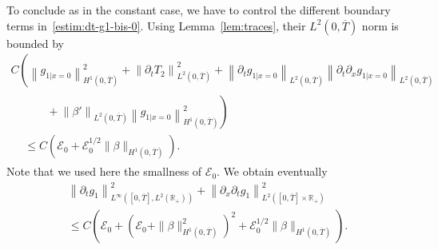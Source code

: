 \documentclass[AHL,Unicode,longabstracts,published]{cedram}
\newcommand{\R}{\mathbb{R}}
\newcommand{\p}{\partial}
\newcommand{\cE}{\mathcal E}
\begin{document}
To conclude as in the constant case, we have to control the different boundary terms in~\eqref{estim:dt-g1-bis-0}. Using Lemma~\ref{lem:traces}, their $L^2(0,\overline{T})$ norm is bounded by
\begin{multline*}
C\left(\left\| g_{1|x=0}\right\|_{H^1\left(0,\overline{T}\right)}^2 + \left\|\p_t T_2\right\|_{L^2\left(0,\overline{T}\right)}^2 + \left\|\p_t g_{1|x=0}\right\|_{L^2\left(0,\overline{T}\right)} \left\|\p_t \p_x g_{1|x=0}\right\|_{L^2\left(0,\overline{T}\right)}\right. \\
\begin{aligned}
&\qquad+\left. \left\|\beta'\right\|_{L^2\left(0,\overline{T}\right)} \left\|g_{1|x=0}\right\|_{H^1\left(0,\overline{T}\right)}^2\right)\\
&\leq {C \left(\cE_0 + \cE_0^{1/2} \|\beta\|_{H^1\left(0,\overline{T}\right)}\right)}.
\end{aligned}
\end{multline*}
Note that we used here the smallness of $\cE_0$. We obtain eventually
\begin{multline*}
\left\|\p_t g_1\right\|_{L^\infty\left([0,\overline{T}], L^2(\R_+)\right)}^2 + \left\|\p_x\p_t g_1\right\|_{L^2\left([0,\overline{T}]\times \R_+\right)}^2 \\
\leq C \left(\cE_0 + \left(\cE_0 + \|\beta\|_{H^1\left(0,\overline{T}\right)}^2\right)^2 + { \cE_0^{1/2} \|\beta\|_{H^1\left(0,\overline{T}\right)}}
\right).
\end{multline*}
\end{document}
